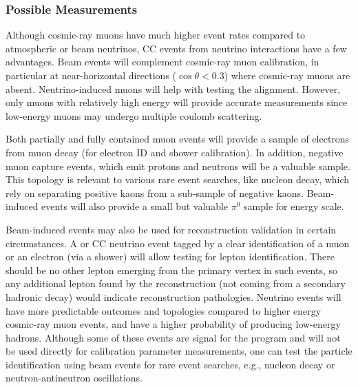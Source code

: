  \subsubsection{Possible Measurements}
   



Although cosmic-ray muons have much higher event rates compared to atmospheric or beam neutrinos, CC events from neutrino interactions have a few advantages. Beam events will complement cosmic-ray muon calibration, in particular at near-horizontal directions ($\cos\theta < 0.3$) where cosmic-ray muons are absent. Neutrino-induced muons will help with testing the  alignment. However, only muons with relatively high energy will provide accurate measurements since low-energy muons may undergo multiple coulomb scattering.

Both partially and fully contained muon events will provide a sample of electrons from muon decay (for electron ID and shower calibration). In addition, negative muon capture events, which emit protons and neutrons will be a valuable sample. This topology is relevant to various rare event searches, like nucleon decay, which rely on separating positive kaons from a sub-sample of negative kaons. Beam-induced events will also provide a small but valuable $\pi^{0}$ sample for energy scale.

Beam-induced events may also be used for reconstruction validation in certain circumstances. A \numu or \nue %
CC neutrino event tagged by a clear identification of a muon or an electron (via a shower) will allow %
testing for lepton identification. 
There should be no other lepton emerging from the primary vertex in such events, so any additional lepton found by the reconstruction (not coming from a secondary hadronic decay) would indicate reconstruction pathologies.
Neutrino events will have more predictable outcomes and topologies compared to higher energy cosmic-ray muon events, and have a higher probability of producing low-energy hadrons.  Although some of these events are signal for the \lbl program and will not be used directly for calibration parameter measurements, one can test the particle identification using beam events for rare event searches, e.g., nucleon decay or neutron-antineutron oscillations.

